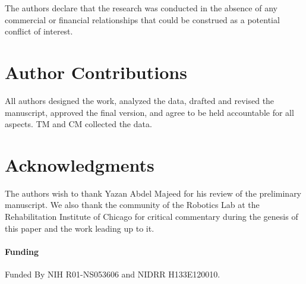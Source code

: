 \documentclass{frontiersSCNS} %
\begin{document}
The authors declare that the research was conducted in the absence of any commercial or financial relationships that could be construed as a potential conflict of interest.

\section*{Author Contributions}

All authors designed the work, analyzed the data, drafted and revised the manuscript, approved the final version, and agree to be held accountable for all aspects. TM and CM collected the data.

\section*{Acknowledgments}
The authors wish to thank Yazan Abdel Majeed for his review of the preliminary manuscript. We also thank the community  of the Robotics Lab at the Rehabilitation Institute of Chicago for critical commentary during the genesis of this paper and the work leading up to it.


\paragraph{Funding\textcolon} Funded By NIH R01-NS053606 and NIDRR H133E120010.




\end{document}
